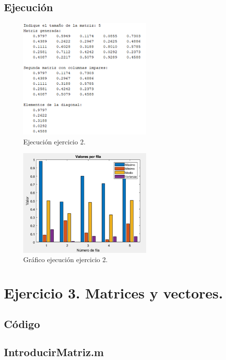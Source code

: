 \documentclass[a4paper, 12pt]{article}
\begin{document}
	\subsection{Ejecución}
	\begin{figure}[htp!]
		\centering
		\includegraphics[width=0.6\textwidth]{figures/ejc2.png}
		\caption{Ejecución ejercicio 2.}
	\end{figure}
	\begin{figure}[htp!]
		\centering
		\includegraphics[width=0.6\textwidth]{figures/graf1.png}
		\caption{Gráfico ejecución ejercicio 2.}
	\end{figure}
	
	\section{Ejercicio 3. Matrices y vectores.}
	
	\subsection{Código}
	\subsection*{IntroducirMatriz.m}
	\inputminted[fontsize=\scriptsize, linenos, breaklines=true, xleftmargin=0.75cm, frame=lines]{matlab}{code/IntroducirMatriz.m}
	\inputminted[fontsize=\scriptsize, linenos, breaklines=true, xleftmargin=0.75cm, frame=lines]{matlab}{code/Ejercicio3.m}
\end{document}
